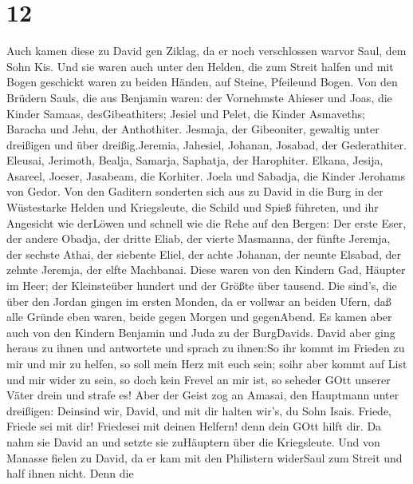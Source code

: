 \hypertarget{section-11}{%
\section{12}\label{section-11}}

 Auch kamen diese zu David gen Ziklag, da er noch
verschlossen warvor Saul, dem Sohn Kis. Und sie waren auch unter den
Helden, die zum Streit halfen  und mit Bogen geschickt waren
zu beiden Händen, auf Steine, Pfeileund Bogen. Von den Brüdern Sauls,
die aus Benjamin waren:  der Vornehmste Ahieser und Joas,
die Kinder Samaas, desGibeathiters; Jesiel und Pelet, die Kinder
Asmaveths; Baracha und Jehu, der Anthothiter.  Jesmaja, der
Gibeoniter, gewaltig unter dreißigen und über dreißig.Jeremia, Jahesiel,
Johanan, Josabad, der Gederathiter.  Eleusai, Jerimoth,
Bealja, Samarja, Saphatja, der Harophiter.  Elkana, Jesija,
Asareel, Joeser, Jasabeam, die Korhiter.  Joela und Sabadja,
die Kinder Jerohams von Gedor.  Von den Gaditern sonderten
sich aus zu David in die Burg in der Wüstestarke Helden und Kriegsleute,
die Schild und Spieß führeten, und ihr Angesicht wie derLöwen und
schnell wie die Rehe auf den Bergen:  Der erste Eser, der
andere Obadja, der dritte Eliab,  der vierte Masmanna, der
fünfte Jeremja,  der sechste Athai, der siebente Eliel,
 der achte Johanan, der neunte Elsabad,  der
zehnte Jeremja, der elfte Machbanai.  Diese waren von den
Kindern Gad, Häupter im Heer; der Kleinsteüber hundert und der Größte
über tausend.  Die sind's, die über den Jordan gingen im
ersten Monden, da er vollwar an beiden Ufern, daß alle Gründe eben
waren, beide gegen Morgen und gegenAbend.  Es kamen aber
auch von den Kindern Benjamin und Juda zu der BurgDavids. 
David aber ging heraus zu ihnen und antwortete und sprach zu ihnen:So
ihr kommt im Frieden zu mir und mir zu helfen, so soll mein Herz mit
euch sein; soihr aber kommt auf List und mir wider zu sein, so doch kein
Frevel an mir ist, so seheder GOtt unserer Väter drein und strafe es!
 Aber der Geist zog an Amasai, den Hauptmann unter
dreißigen: Deinsind wir, David, und mit dir halten wir's, du Sohn Isais.
Friede, Friede sei mit dir! Friedesei mit deinen Helfern! denn dein GOtt
hilft dir. Da nahm sie David an und setzte sie zuHäuptern über die
Kriegsleute.  Und von Manasse fielen zu David, da er kam
mit den Philistern widerSaul zum Streit und half ihnen nicht. Denn die
